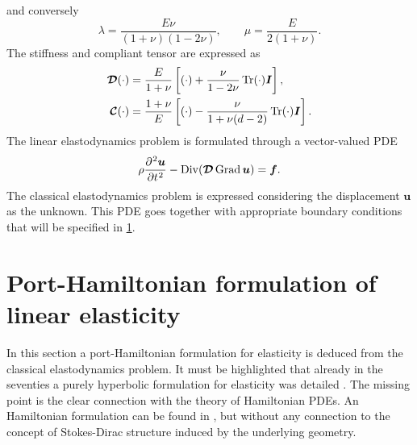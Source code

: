 and conversely
\begin{equation}
\lambda =\frac {E \nu }{(1+\nu )(1-2\nu )}, \qquad
\mu = \frac{E}{2(1+\nu)}.
\end{equation}
The stiffness and compliant tensor are expressed as
\begin{align}
	\bm{\mathcal{D}}(\cdot) &= \frac{E}{1+\nu} \left[(\cdot) + \frac{\nu}{1-2\nu}\Tr(\cdot)\bm{I}\right], \label{eq:stiff3D} \vspace{3pt}\\
	\bm{\mathcal{C}}(\cdot) &= \frac{1+\nu}{E}\left[(\cdot) - \frac{\nu}{1+\nu(d-2)}\Tr(\cdot)\bm{I}\right]. \label{eq:compl3D}
\end{align}
The linear elastodynamics problem is formulated through a vector-valued PDE
\begin{equation}\label{eq:lin_elastodyn}
\rho \diffp[2]{\bm{u}}{t} - \Div(\bm{\mathcal{D}} \Grad \bm{u}) = \bm{f}.
\end{equation}  
The classical elastodynamics problem is expressed considering the displacement $\bm{u}$ as the unknown. This PDE goes together with appropriate boundary conditions that will be specified in \ref{sec:pHelas}.



\section{Port-Hamiltonian formulation of linear elasticity}\label{sec:pHelas}

In this section a port-Hamiltonian formulation for elasticity is deduced from the classical elastodynamics problem. It must be highlighted that already in the seventies a purely hyperbolic formulation for elasticity was detailed \cite{hughes1978classical}. The missing point is the clear connection with the theory of Hamiltonian PDEs. An Hamiltonian formulation can be found in \cite[Chapter 16]{grinfield2015}, but without any connection to the concept of Stokes-Dirac structure induced by the underlying geometry. \\

